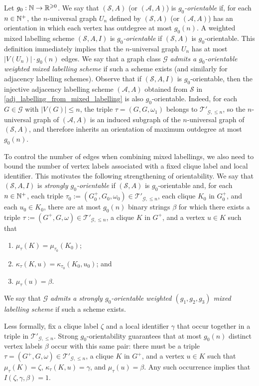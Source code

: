 \documentclass{patmorin}
\renewcommand{\ge}{\geqslant}
\renewcommand{\le}{\leqslant}
\newcommand{\defin}[1]{\emph{\textcolor{brightmaroon}{#1}}}
\newcommand{\calA}{\mathcal{A}}
\newcommand{\calG}{\mathcal{G}}
\newcommand{\calS}{\mathcal{S}}
\newcommand{\calT}{\mathcal{T}}
\begin{document}
Let $g_0:\N\to\R^{\ge 0}$.
We say that $(\calS,A)$ (or $(\calA,A)$) is \defin{$g_0$-orientable} if, for each $n\in\mathbb{N}^+$, the $n$-universal graph $U_n$ defined by $(\calS,A)$ (or $(\calA,A)$) has an orientation in which each vertex has outdegree at most $g_0(n)$. A weighted mixed labelling scheme $(\calS,A,I)$ is \defin{$g_0$-orientable} if $(\calS,A)$ is $g_0$-orientable. This definition immediately implies that the $n$-universal graph $U_n$ has at most $|V(U_n)|\cdot g_0(n)$ edges. We say that a graph class $\calG$ \defin{admits a $g_0$-orientable weighted mixed labelling scheme} if such a scheme exists (and similarly for adjacency labelling schemes).
Observe that if $(\calS,A,I)$ is $g_0$-orientable, then the injective adjacency labelling scheme $(\calA,A)$ obtained from $\calS$ in \cref{adj_labelling_from_mixed_labelling} is also $g_0$-orientable. Indeed, for each $G\in\calG$ with $|V(G)|\le n$, the triple $\tau=(G,G,\omega_1)$ belongs to $\calT'_{\calG,\le n}$, so the $n$-universal graph of $(\calA,A)$ is an induced subgraph of the $n$-universal graph of $(\calS,A)$, and therefore inherits an orientation of maximum outdegree at most $g_0(n)$.

To control the number of edges when combining mixed labellings, we also need to bound the number of vertex labels associated with a fixed clique label and local identifier. This motivates the following strengthening of orientability.
We say that $(\calS,A,I)$ is \defin{strongly $g_0$-orientable} if $(\calS,A)$ is $g_0$-orientable and, for each $n\in\mathbb{N}^+$, each triple $\tau_0:=(G_0^+,G_0,\omega_0)\in\calT'_{\calG,\le n}$, each clique $K_0$ in $G_0^+$, and each $u_0\in K_0$, there are at most $g_0(n)$ binary strings $\beta$ for which there exists a triple $\tau:=(G^+,G,\omega)\in\calT'_{\calG,\le n}$, a clique $K$ in $G^+$, and a vertex $u\in K$ such that
\begin{enumerate}[nosep,nolistsep,label=(\alph*)]
  \item $\mu_\tau(K)=\mu_{\tau_0}(K_0)$;
  \item $\kappa_\tau(K,u)=\kappa_{\tau_0}(K_0,u_0)$; and
  \item $\mu_\tau(u)=\beta$.
\end{enumerate}
We say that $\calG$ \defin{admits a strongly $g_0$-orientable weighted $(g_1,g_2,g_3)$ mixed labelling scheme} if such a scheme exists.

Less formally, fix a clique label $\zeta$ and a local identifier $\gamma$ that occur together in a triple in $\calT'_{\calG,\le n}$. Strong $g_0$-orientability guarantees that at most $g_0(n)$ distinct vertex labels $\beta$ occur with this same pair: there must be a triple $\tau=(G^+,G,\omega)\in\calT'_{\calG,\le n}$, a clique $K$ in $G^+$, and a vertex $u\in K$ such that $\mu_\tau(K)=\zeta$, $\kappa_\tau(K,u)=\gamma$, and $\mu_\tau(u)=\beta$. Any such occurrence implies that $I(\zeta,\gamma,\beta)=1$.
\end{document}
